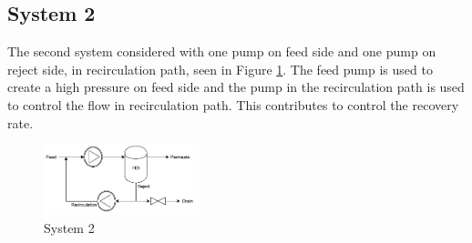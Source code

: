 \subsection{System 2}
The second system considered with one pump on feed side and one pump on reject side, in recirculation path, seen in Figure \ref{fig:Sys2}. The feed pump is used to create a high pressure on feed side and the pump in the recirculation path is used to control the flow in recirculation path. This contributes to control the recovery rate.
\begin{figure}[h]
    \centering
    \includegraphics[width=0.4\textwidth]{Sys2}
    \caption{System 2}
    \label{fig:Sys2}
\end{figure}

